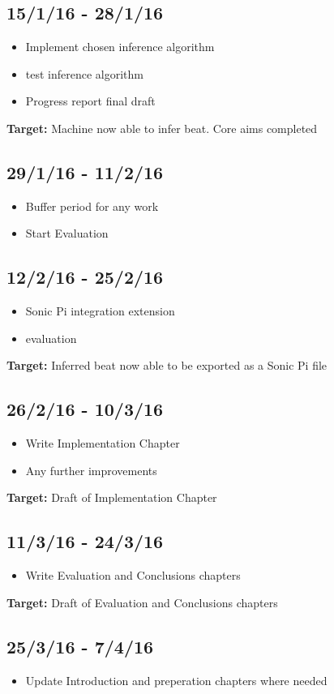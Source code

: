 \documentclass[12pt,a4]{article}
\begin{document}
		\subsection{15/1/16 - 28/1/16}
\begin{itemize}
		\item Implement chosen inference algorithm
		\item test inference algorithm
		\item Progress report final draft
\end{itemize}
{\bf Target:} Machine now able to infer beat. Core aims completed		
		\subsection{29/1/16 - 11/2/16}
		\begin{itemize}
			\item Buffer period for any work
			\item Start Evaluation
		\end{itemize}
		\subsection{12/2/16 - 25/2/16}
		\begin{itemize}
			\item Sonic Pi integration extension
			\item evaluation
		\end{itemize}
		{\bf Target:} Inferred beat now able to be exported as a Sonic Pi file
		\subsection{26/2/16 - 10/3/16}
		\begin{itemize}
			\item Write Implementation Chapter
			\item Any further improvements
		\end{itemize}
{\bf Target:} Draft of Implementation Chapter
		\subsection{11/3/16 - 24/3/16}
		\begin{itemize}
			\item Write Evaluation and Conclusions chapters
		\end{itemize}
{\bf Target:} Draft of Evaluation and Conclusions chapters
		\subsection{25/3/16 - 7/4/16}
		\begin{itemize}
			\item Update Introduction and preperation chapters where needed
		\end{itemize}
\end{document}
